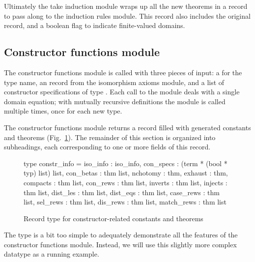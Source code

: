 Ultimately the take induction module wraps up all the new theorems in a  record to pass along to the induction rules module. This record also includes the original  record, and a boolean flag to indicate finite-valued domains.

\subsection{Constructor functions module}

The constructor functions module is called with three pieces of input: a  for the type name, an  record from the isomorphism axioms module, and a list of constructor specifications of type  . Each call to the module deals with a single domain equation; with mutually recursive definitions the module is called multiple times, once for each new type.

The constructor functions module returns a  record filled with generated constants and theorems (Fig.~\ref{fig:domain-constr-info}). The remainder of this section is organized into subheadings, each corresponding to one or more fields of this record.

\begin{figure}
\begin{hscode}
type constr_info =
  {
    iso_info  : iso_info,
    con_specs : (term * (bool * typ) list) list,
    con_betas : thm list,
    nchotomy  : thm,         exhaust    : thm,
    compacts  : thm list,    con_rews   : thm list,
    inverts   : thm list,    injects    : thm list,
    dist_les  : thm list,    dist_eqs   : thm list,
    case_rews : thm list,    sel_rews   : thm list,
    dis_rews  : thm list,    match_rews : thm list
  }
\end{hscode}
\caption{Record type for constructor-related constants and theorems}
\label{fig:domain-constr-info}
\end{figure}

The  type is a bit too simple to adequately demonstrate all the features of the constructor functions module. Instead, we will use this slightly more complex  datatype as a running example.

